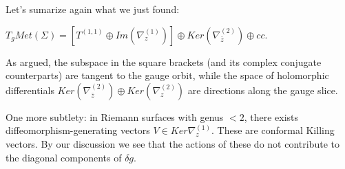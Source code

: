     Let's sumarize again what we just found:

    \begin{prop}
        $T_g Met(\Sigma) = [ T^{(1,1)} \oplus Im(\nabla^{(1)}_z) ] \oplus Ker(\nabla^{(2)}_{\bar z})\oplus cc.$
    \end{prop}

    As argued, the subspace in the square brackets (and its complex conjugate counterparts) are tangent to the gauge orbit, while the space of holomorphic differentials $Ker(\nabla^{(2)}_{\bar z})\oplus Ker(\nabla^{(2)}_{z})$ are directions along the gauge slice.

    One more subtlety: in Riemann surfaces with genus $< 2$, there exists diffeomorphism-generating vectors $V \in Ker \nabla^{(1)}_z$. These are conformal Killing vectors. By our discussion we see that the actions of these do not contribute to the diagonal components of $\delta g$.